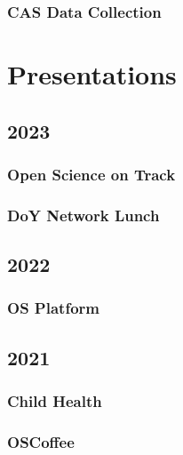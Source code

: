 \documentclass[
  letterpaper,
  DIV=11,
  numbers=noendperiod]{scrreprt}
\begin{document}
\subsection*{CAS Data Collection}\label{cas-data-collection-2}

\chapter*{Presentations}\label{presentations}


\section*{2023}\label{section-4}


\subsection*{Open Science on Track}\label{open-science-on-track}

\subsection*{DoY Network Lunch}\label{doy-network-lunch}

\section*{2022}\label{section-5}


\subsection*{OS Platform}\label{os-platform}

\section*{2021}\label{section-6}


\subsection*{Child Health}\label{child-health}

\subsection*{OSCoffee}\label{oscoffee}
\end{document}
